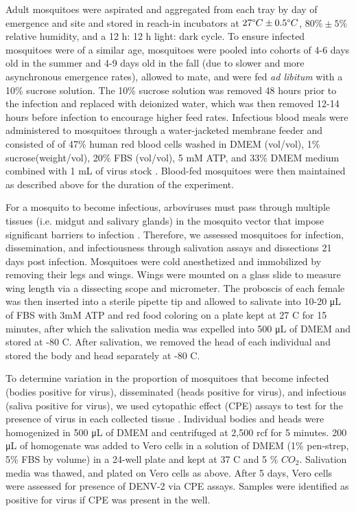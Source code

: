 \documentclass[12pt]{article}
\begin{document}
Adult mosquitoes were aspirated and aggregated from each tray by day of emergence and site and stored in reach-in incubators at $27 \degree C \pm 0.5 \degree C$, $80\% \pm 5\%$ relative humidity, and a 12 h: 12 h light: dark cycle. To ensure infected mosquitoes were of a similar age, mosquitoes were pooled into cohorts of 4-6 days old in the summer and 4-9 days old in the fall (due to slower and more asynchronous emergence rates), allowed to mate, and were fed \textit{ad libitum} with a 10\% sucrose solution. The 10\% sucrose solution was removed 48 hours prior to the infection and replaced with deionized water, which was then removed 12-14 hours before infection to encourage higher feed rates. Infectious blood meals were administered to mosquitoes through a water-jacketed membrane feeder and consisted of of 47\% human red blood cells washed in DMEM (vol/vol), 1\% sucrose(weight/vol), 20\% FBS (vol/vol), 5 mM ATP, and 33\% DMEM medium combined with 1 mL of virus stock \citep{shan2016}. Blood-fed mosquitoes were then maintained as described above for the duration of the experiment.

For a mosquito to become infectious, arboviruses must pass through multiple tissues (i.e. midgut and salivary glands) in the mosquito vector that impose significant barriers to infection \citep{cheng2016}. Therefore, we assessed mosquitoes for infection, dissemination, and infectiousness through salivation assays and dissections \citep{hurlbut1966,anderson2010} 21 days post infection. Mosquitoes were cold anesthetized and immobilized by removing their legs and wings. Wings were mounted on a glass slide to measure wing length via a dissecting scope and micrometer. The proboscis of each female was then inserted into a sterile pipette tip and allowed to salivate into 10-20 \si{\micro\liter} of FBS with 3mM ATP and red food coloring on a plate kept at 27 \degree C for 15 minutes, after which the salivation media was expelled into 500 \si{\micro\liter} of DMEM and stored at -80 \degree C. After salivation, we removed the head of each individual and stored the body and head separately at -80 \degree C. 

To determine variation in the proportion of mosquitoes that become infected (bodies positive for virus), disseminated (heads positive for virus), and infectious (saliva positive for virus), we used cytopathic effect (CPE) assays to test for the presence of virus in each collected tissue \citep{balaya1969}. Individual bodies and heads were homogenized in 500 \si{\micro\liter} of DMEM and centrifuged at 2,500 rcf for 5 minutes. 200 \si{\micro\liter} of homogenate was added to Vero cells in a solution of DMEM (1\% pen-strep, 5\% FBS by volume) in a 24-well plate and kept at 37 \degree C and 5 \% ${CO_2}$. Salivation media was thawed, and plated on Vero cells as above. After 5 days, Vero cells were assessed for presence of DENV-2 via CPE assays. Samples were identified as positive for virus if CPE was present in the well.
\end{document}
